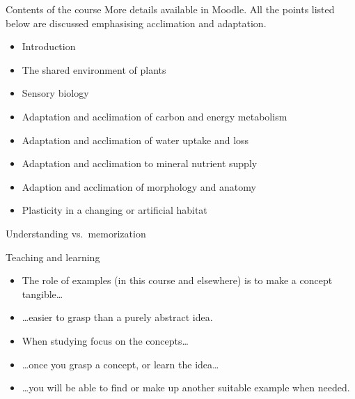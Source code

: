 \documentclass[10pt]{beamer}
\begin{document}
\begin{frame}{Contents of the course}
More details available in Moodle. All the points listed below are discussed emphasising acclimation and adaptation.
\begin{itemize}
   \item Introduction
   \item The shared environment of plants
   \item Sensory biology
   \item Adaptation and acclimation of carbon and energy metabolism
   \item Adaptation and acclimation of water uptake and loss
   \item Adaptation and acclimation to mineral nutrient supply
   \item Adaption and acclimation of morphology and anatomy
   \item Plasticity in a changing or artificial habitat
\end{itemize}
\end{frame}

\begin{frame}{Understanding vs.\ memorization}

  \begin{alertblock}{Teaching and learning}
    \begin{itemize}
      \item The role of examples (in this course and elsewhere) is to make a concept tangible\ldots
      \item \ldots easier to grasp than a purely abstract idea.
      \item When studying focus on the concepts\ldots
      \item \ldots once you grasp a concept, or learn the idea\ldots
      \item \ldots you will be able to find or make up another suitable example when needed.
    \end{itemize}
  \end{alertblock}

\end{frame}
\end{document}
